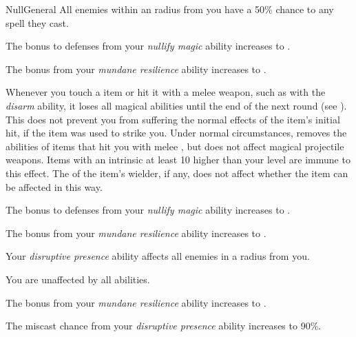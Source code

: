 \begin{feat}{Null}{General}
         All enemies within an \areamed radius from you have a 50\% chance to  any spell they cast.

         The bonus to defenses from your \textit{nullify magic} ability increases to .

         The bonus from your \textit{mundane resilience} ability increases to .

         Whenever you touch a  item or hit it with a melee weapon, such as with the \textit{disarm} ability, it loses all magical abilities until the end of the next round (see ).
        This does not prevent you from suffering the normal effects of the item's initial hit, if the item was used to strike you.
        Under normal circumstances, removes the abilities of items that hit you with melee , but does not affect magical projectile weapons.
        Items with an intrinsic  at least 10 higher than your level are immune to this effect.
        The  of the item's wielder, if any, does not affect whether the item can be affected in this way.

         The bonus to defenses from your \textit{nullify magic} ability increases to .

         The bonus from your \textit{mundane resilience} ability increases to .

         Your \textit{disruptive presence} ability affects all enemies in a \areahuge radius  from you.

         You are unaffected by all  abilities.

         The bonus from your \textit{mundane resilience} ability increases to .

         The miscast chance from your \textit{disruptive presence} ability increases to 90\%.
    \end{feat}

